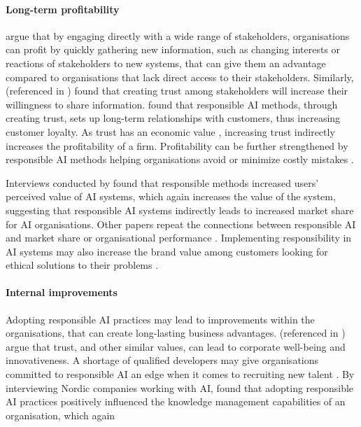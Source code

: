 \paragraph{Long-term profitability}
\textcite{Buhmann_2021} argue that by engaging directly with a wide range of stakeholders, organisations can profit by quickly gathering new information, such as changing interests or reactions of stakeholders to new systems, that can give them an advantage compared to organisations that lack direct access to their stakeholders. Similarly, \textcite{Zaheer_2017_trustvalue} (referenced in \cite{Liu_2021}) found that creating trust among stakeholders will increase their willingness to share information. \textcite{Liu_2021,Morley_2021} found that responsible AI methods, through creating trust, sets up long-term relationships with customers, thus increasing customer loyalty. As trust has an economic value \parencite{Minkkinen_2021}, increasing trust indirectly increases the profitability of a firm. Profitability can be further strengthened by responsible AI methods helping organisations avoid or minimize costly mistakes \parencite{Floridi_2018,Rakova_2021}.

Interviews conducted by \textcite{Kumar_2021} found that responsible methods increased users' perceived value of AI systems, which again increases the value of the system, suggesting that responsible AI systems indirectly leads to increased market share for AI organisations. Other papers repeat the connections between responsible AI and market share \parencite{Cheng_2021} or organisational performance \parencite{Werder_2022}. Implementing responsibility in AI systems may also increase the brand value among customers looking for ethical solutions to their problems \parencite{Minkkinen_2021,WangY_2020}.

\paragraph{Internal improvements}
Adopting responsible AI practices may lead to improvements within the organisations, that can create long-lasting business advantages. \textcite{WidénWulff_2004_trustvalue} (referenced in \cite{Liu_2021}) argue that trust, and other similar values, can lead to corporate well-being and innovativeness. A shortage of qualified developers may give organisations committed to responsible AI an edge when it comes to recruiting new talent \parencite{Papagiannidis_2022}. By interviewing Nordic companies working with AI, \textcite[p.~65]{Papagiannidis_2022} found that adopting responsible AI practices positively influenced the knowledge management capabilities of an organisation, which again 
